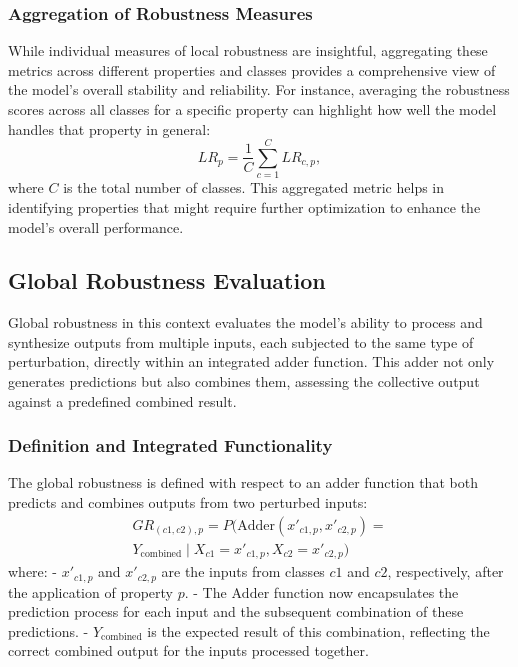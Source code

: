 \documentclass[10pt, conference, a4paper, final]{IEEEtran}
\begin{document}
    \subsubsection{Aggregation of Robustness Measures}
    While individual measures of local robustness are insightful, aggregating these metrics across different properties and classes provides a comprehensive view of the model's overall stability and reliability. For instance, averaging the robustness scores across all classes for a specific property can highlight how well the model handles that property in general:
    \begin{equation}
        LR_p = \frac{1}{C} \sum_{c=1}^C LR_{c,p},
    \end{equation}
    where \(C\) is the total number of classes. This aggregated metric helps in identifying properties that might require further optimization to enhance the model's overall performance.



        \subsection{Global Robustness Evaluation}
        Global robustness in this context evaluates the model's ability to process and synthesize outputs from multiple inputs, each subjected to the same type of perturbation, directly within an integrated adder function. This adder not only generates predictions but also combines them, assessing the collective output against a predefined combined result.
        
        \subsubsection{Definition and Integrated Functionality}
        The global robustness is defined with respect to an adder function that both predicts and combines outputs from two perturbed inputs:
        \begin{multline}
            GR_{(c1, c2), p} = P(\text{Adder}(x'_{c1,p}, x'_{c2,p}) = \\
            Y_{\text{combined}} \mid X_{c1} = x'_{c1,p}, X_{c2} = x'_{c2,p})
        \end{multline}
        where:        
        - \(x'_{c1,p}\) and \(x'_{c2,p}\) are the inputs from classes \(c1\) and \(c2\), respectively, after the application of property \(p\).
        - The \(\text{Adder}\) function now encapsulates the prediction process for each input and the subsequent combination of these predictions.
        - \(Y_{\text{combined}}\) is the expected result of this combination, reflecting the correct combined output for the inputs processed together.
        
\end{document}
